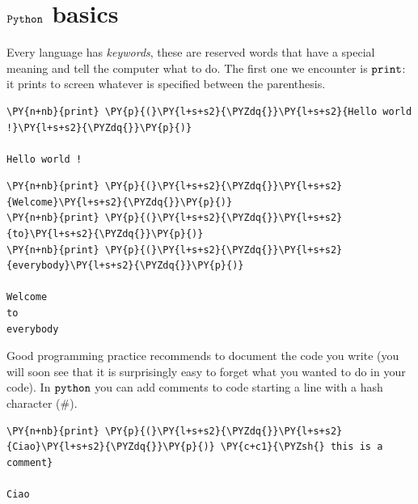 \section{$\tt{Python}$ basics}\label{python-basics}

Every language has \emph{keywords}, these are reserved words that have a special meaning and tell the computer what to do. The first one we encounter is \(\tt{print}\): it prints to screen whatever is specified between the parenthesis.

\begin{tcolorbox}[breakable, size=fbox, boxrule=1pt, pad at break*=1mm, colback=cellbackground, colframe=cellborder]
\begin{Verbatim}[commandchars=\\\{\}]
\PY{n+nb}{print} \PY{p}{(}\PY{l+s+s2}{\PYZdq{}}\PY{l+s+s2}{Hello world !}\PY{l+s+s2}{\PYZdq{}}\PY{p}{)} 

Hello world !
\end{Verbatim}
\end{tcolorbox}

\begin{tcolorbox}[breakable, size=fbox, boxrule=1pt, pad at break*=1mm, colback=cellbackground, colframe=cellborder]
\begin{Verbatim}[commandchars=\\\{\}]
\PY{n+nb}{print} \PY{p}{(}\PY{l+s+s2}{\PYZdq{}}\PY{l+s+s2}{Welcome}\PY{l+s+s2}{\PYZdq{}}\PY{p}{)}
\PY{n+nb}{print} \PY{p}{(}\PY{l+s+s2}{\PYZdq{}}\PY{l+s+s2}{to}\PY{l+s+s2}{\PYZdq{}}\PY{p}{)}
\PY{n+nb}{print} \PY{p}{(}\PY{l+s+s2}{\PYZdq{}}\PY{l+s+s2}{everybody}\PY{l+s+s2}{\PYZdq{}}\PY{p}{)}

Welcome
to
everybody
\end{Verbatim}
\end{tcolorbox}

Good programming practice recommends to document the code you write (you will soon see that it is surprisingly easy to forget what you wanted to do in your code). In \(\tt{python}\) you can add comments to code starting a line with a hash character (\#).

\begin{tcolorbox}[breakable, size=fbox, boxrule=1pt, pad at break*=1mm, colback=cellbackground, colframe=cellborder]
\begin{Verbatim}[commandchars=\\\{\}]
\PY{n+nb}{print} \PY{p}{(}\PY{l+s+s2}{\PYZdq{}}\PY{l+s+s2}{Ciao}\PY{l+s+s2}{\PYZdq{}}\PY{p}{)} \PY{c+c1}{\PYZsh{} this is a comment}

Ciao
\end{Verbatim}
\end{tcolorbox}

